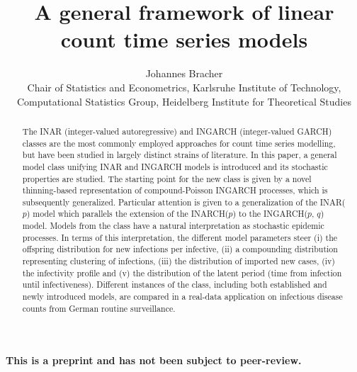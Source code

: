 \documentclass{article}
\begin{document}
\title{A general framework of linear count time series models}
\author{Johannes Bracher\\
Chair of Statistics and Econometrics, Karlsruhe Institute of Technology, \\ %
Computational Statistics Group, Heidelberg Institute for Theoretical Studies}


\newcommand{\juv}{E}

\maketitle


\begin{abstract}
The INAR (integer-valued autoregressive) and INGARCH (integer-valued GARCH) classes are the most commonly employed approaches for count time series modelling, but have been studied in largely distinct strains of literature. In this paper, a general model class unifying INAR and INGARCH models is introduced and its stochastic properties are studied. The starting point for the new class is given by a novel thinning-based representation of compound-Poisson INGARCH processes, which is subsequently generalized. Particular attention is given to a generalization of the INAR($p$) model which parallels the extension of the INARCH($p$) to the INGARCH($p$, $q$) model. Models from the class have a natural interpretation as stochastic epidemic processes. In terms of this interpretation, the different model parameters steer (i) the offspring distribution for new infections per infective, (ii) a compounding distribution representing clustering of infections, (iii) the distribution of imported new cases, (iv) the infectivity profile and (v) the distribution of the latent period (time from infection until infectiveness). Different instances of the class, including both established and newly introduced models, are compared in a real-data application on infectious disease counts from German routine surveillance. 
\end{abstract}

\bigskip

\begin{center}
\textbf{This is a preprint and has not been subject to peer-review.}
\end{center}
\end{document}
